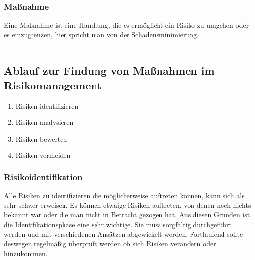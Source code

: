 \documentclass[12pt, oneside]{article}
\begin{document}
\subsubsection{Maßnahme}
Eine Maßnahme ist eine Handlung, die es ermöglicht ein Risiko zu umgehen oder es einzugrenzen, hier spricht man von der Schadensminimierung. 
\\
\\
\subsection{Ablauf zur Findung von Maßnahmen im Risikomanagement}
\begin{enumerate}
    \item Risiken identifizieren
    \item Risiken analysieren
    \item Risiken bewerten
    \item Risiken vermeiden
\end{enumerate}

\subsubsection{Risikoidentifikation}
Alle Risiken zu identifizieren die möglicherweise auftreten können, kann sich als sehr schwer erweisen. Es können etwaige Risiken auftreten, von denen noch nichts bekannt war oder die man nicht in Betracht gezogen hat. Aus diesen Gründen ist die Identifikationsphase eine sehr wichtige. Sie muss sorgfältig durchgeführt werden und mit verschiedenen Ansätzen abgewickelt werden. Fortlaufend sollte deswegen regelmäßig überprüft werden ob sich Risiken verändern oder hinzukommen.
\\

\end{document}

